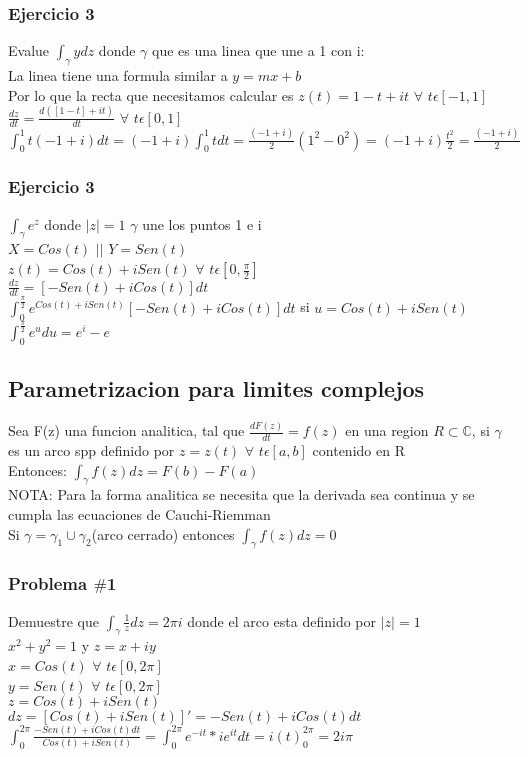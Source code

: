 \documentclass{article}
\begin{document}
\subsubsection*{Ejercicio 3}
Evalue $\int_\gamma ydz$ donde $\gamma$ que es una linea que une a 1 con i:
\\La linea tiene una formula similar a $y=mx+b$
\\Por lo que la recta que necesitamos calcular es $z(t)=1-t+it$ $\forall$ $t\epsilon[-1,1]$
\\$\frac{dz}{dt}=\frac{d([1-t]+it)}{dt}$ $\forall$ $t\epsilon[0,1]$
\\$\int_0^1t(-1+i)dt = (-1+i)\int_0^1tdt = \frac{(-1+i)}{2}(1^2-0^2)=(-1+i)\frac{t^2}{2} = \frac{(-1+i)}{2}$ 

\subsubsection*{Ejercicio 3}
$\int_\gamma e^z$ donde $|z| = 1$ $\gamma$ une los puntos 1 e i
\\$X=Cos(t)$ $||$ $Y=Sen(t)$
\\$z(t)=Cos(t) + iSen(t)$ $\forall$ $t\epsilon[0,\frac{\pi}{2}]$
\\$\frac{dz}{dt} = [-Sen(t)+iCos(t)]dt$
\\$\int_0^{\frac{\pi}{2}} e^{Cos(t)+iSen(t)}[-Sen(t)+iCos(t)]dt$ si $u = Cos(t)+iSen(t)$
\\$\int_0^{\frac{\pi}{2}}e^u du = e^i-e$
\subsection*{Parametrizacion para limites complejos}
Sea F(z) una funcion analitica, tal que $\frac{dF(z)}{dt}=f(z)$ en una region $R\subset\mathbb{C} $, si $\gamma$ es un arco spp definido por $z=z(t)$ $\forall$ $t\epsilon[a,b]$ contenido en R
\\Entonces: $\int_\gamma f(z)dz = F(b) - F(a)$
\\NOTA: Para la forma analitica se necesita que la derivada sea continua y se cumpla las ecuaciones de Cauchi-Riemman
\\Si $\gamma = \gamma_1 \cup \gamma_2$(arco cerrado) entonces $\int_\gamma f(z)dz = 0$ 

\subsubsection*{Problema $\#$1}
Demuestre que $\int_\gamma \frac{1}{z} dz= 2\pi i$ donde el arco esta definido por $|z|=1$
\\$x^2 + y^2 = 1$ y $z=x+iy$
\\$x=Cos(t)$ $\forall$ $t\epsilon[0,2\pi]$
\\$y=Sen(t)$ $\forall$ $t\epsilon[0,2\pi]$
\\$z=Cos(t)+iSen(t)$
\\$dz=[Cos(t)+iSen(t)]' = -Sen(t)+iCos(t)dt$
\\$\int_0^{2\pi} \frac{-Sen(t)+iCos(t)dt}{Cos(t)+iSen(t)} = \int_0^{2\pi}e^{-it}*ie^{it}dt = i(t)_0^{2\pi} = 2i\pi$
\end{document}
